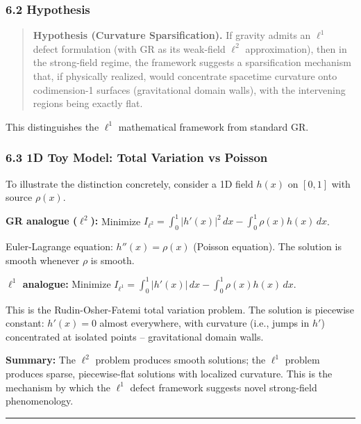 \documentclass[
]{article}
\begin{document}
\subsubsection{6.2 Hypothesis}\label{hypothesis}

\begin{quote}
\textbf{Hypothesis (Curvature Sparsification).} If gravity admits an
\(\ell^1\) defect formulation (with GR as its weak-field \(\ell^2\)
approximation), then in the strong-field regime, the framework suggests
a sparsification mechanism that, if physically realized, would
concentrate spacetime curvature onto codimension-1 surfaces
(gravitational domain walls), with the intervening regions being exactly
flat.
\end{quote}

This distinguishes the \(\ell^1\) mathematical framework from standard
GR.

\subsubsection{6.3 1D Toy Model: Total Variation vs
Poisson}\label{d-toy-model-total-variation-vs-poisson}

To illustrate the distinction concretely, consider a 1D field \(h(x)\)
on \([0, 1]\) with source \(\rho(x)\).

\textbf{GR analogue (\(\ell^2\)):} Minimize
\(I_{\ell^2} = \int_0^1 |h'(x)|^2 \, dx - \int_0^1 \rho(x) h(x) \, dx\).

Euler-Lagrange equation: \(h''(x) = \rho(x)\) (Poisson equation). The
solution is smooth whenever \(\rho\) is smooth.

\textbf{\(\ell^1\) analogue:} Minimize
\(I_{\ell^1} = \int_0^1 |h'(x)| \, dx - \int_0^1 \rho(x) h(x) \, dx\).

This is the Rudin-Osher-Fatemi total variation problem. The solution is
piecewise constant: \(h'(x) = 0\) almost everywhere, with curvature
(i.e., jumps in \(h'\)) concentrated at isolated points -- gravitational
domain walls.

\textbf{Summary:} The \(\ell^2\) problem produces smooth solutions; the
\(\ell^1\) problem produces sparse, piecewise-flat solutions with
localized curvature. This is the mechanism by which the \(\ell^1\)
defect framework suggests novel strong-field phenomenology.

\begin{center}\rule{0.5\linewidth}{0.5pt}\end{center}
\end{document}
